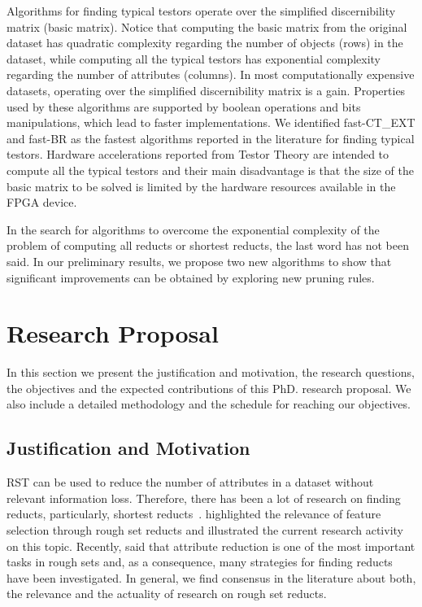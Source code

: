 \documentclass[authoryear,11pt]{elsarticle}
\begin{document}
  Algorithms for finding typical testors operate over the simplified discernibility matrix (basic matrix). Notice
  that computing the basic matrix from the original dataset has quadratic complexity regarding the number of
  objects (rows) in the dataset, while computing all the typical testors has exponential complexity regarding the
  number of attributes (columns). 
  In most computationally expensive datasets, operating over the simplified discernibility matrix is a gain. 
  Properties used by these algorithms are supported by boolean operations and bits manipulations, which lead to
  faster implementations. We identified fast-CT\_EXT \citep{Sanchez10} and fast-BR \citep{Lias13} as the fastest
  algorithms reported in the literature for finding typical testors. Hardware accelerations reported from Testor
  Theory are intended to compute all the typical testors and their main disadvantage is  that the size of the
  basic matrix to be solved is limited by the hardware resources available in the FPGA device.
  
  In the search for algorithms to overcome the exponential complexity of the problem of computing all reducts or
  shortest reducts, the last word has not been said. In our preliminary results, we propose 
  two new algorithms to show that significant improvements can be obtained by exploring new pruning rules.

\section{Research Proposal}\label{ResearchProposal} 
 In this section we present the justification and motivation, the research questions, the objectives and the
 expected contributions of this PhD. research proposal. We also include a detailed methodology and the schedule 
 for reaching our objectives.

\subsection{Justification and Motivation}\label{Justification}
  RST can be used to reduce the number of attributes in a dataset without relevant information loss. 
  Therefore, there has been a lot of research on finding reducts, particularly, shortest 
  reducts~\citep{Jensen14}. \cite{Zheng14} highlighted the relevance of feature selection through rough
  set reducts and illustrated the current research activity on this topic. Recently, \cite{Jiang15} said that 
  attribute reduction is one of the most important tasks in rough sets and, as a consequence,  many strategies 
  for finding reducts have been investigated. In general, we find consensus in the literature about both,
  the relevance and the actuality of research on rough set reducts.
  
\end{document}
